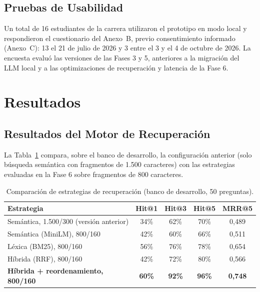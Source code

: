 \subsection{Pruebas de Usabilidad}
Un total de 16 estudiantes de la carrera utilizaron el prototipo en modo local y respondieron el cuestionario del Anexo~B, previo consentimiento informado (Anexo~C): 13 el 21 de julio de 2026 y 3 entre el 3 y el 4 de octubre de 2026. La encuesta evaluó las versiones de las Fases 3 y 5, anteriores a la migración del LLM local y a las optimizaciones de recuperación y latencia de la Fase 6.

\section{Resultados}

\subsection{Resultados del Motor de Recuperación}
\label{sec:resultados_rag}
La Tabla~\ref{tab:resultados_rag} compara, sobre el banco de desarrollo, la configuración anterior (solo búsqueda semántica con fragmentos de 1.500 caracteres) con las estrategias evaluadas en la Fase 6 sobre fragmentos de 800 caracteres.

\begin{table}[H]
  \caption{Comparación de estrategias de recuperación (banco de desarrollo, 50 preguntas).}
  \label{tab:resultados_rag}
  \centering
  \small
  \renewcommand{\arraystretch}{1.2}
  \begin{tabular}{|l|c|c|c|c|}
    \hline
    \rowcolor[HTML]{EFEFEF}
    \textbf{Estrategia} & \textbf{Hit@1} & \textbf{Hit@3} & \textbf{Hit@5} & \textbf{MRR@5} \\ \hline
    Semántica, 1.500/300 (versión anterior) & 34\% & 62\% & 70\% & 0,489 \\ \hline
    Semántica (MiniLM), 800/160 & 42\% & 60\% & 66\% & 0,511 \\ \hline
    Léxica (BM25), 800/160 & 56\% & 76\% & 78\% & 0,654 \\ \hline
    Híbrida (RRF), 800/160 & 42\% & 72\% & 80\% & 0,566 \\ \hline
    \textbf{Híbrida + reordenamiento, 800/160} & \textbf{60\%} & \textbf{92\%} & \textbf{96\%} & \textbf{0,748} \\ \hline
  \end{tabular}
  \elaboradopor{\autorTFG}
\end{table}

